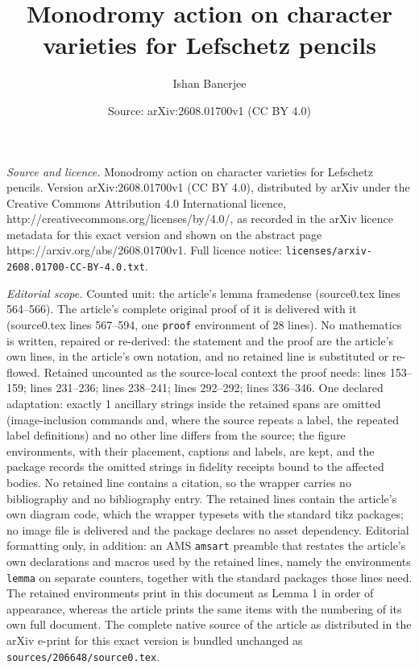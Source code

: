 \documentclass[10pt,a4paper]{amsart}
\title{Monodromy action on character varieties for Lefschetz pencils}
\author{Ishan Banerjee}
\date{Source: arXiv:2608.01700v1 (CC BY 4.0)}
\begin{document}
\maketitle

\noindent\emph{Source and licence.} Monodromy action on character varieties for Lefschetz pencils. Version arXiv:2608.01700v1 (CC BY 4.0), distributed by arXiv under the Creative Commons Attribution 4.0 International licence, http://creativecommons.org/licenses/by/4.0/, as recorded in the arXiv licence metadata for this exact version and shown on the abstract page https://arxiv.org/abs/2608.01700v1. Full licence notice: \texttt{licenses/arxiv-2608.01700-CC-BY-4.0.txt}.\par\smallskip

\noindent\textit{Editorial scope.} Counted unit: the article's lemma framedense (source0.tex lines 564--566). The article's complete original proof of it is delivered with it (source0.tex lines 567--594, one \texttt{proof} environment of 28 lines). No mathematics is written, repaired or re-derived: the statement and the proof are the article's own lines, in the article's own notation, and no retained line is substituted or re-flowed.  Retained uncounted as the source-local context the proof needs: lines 153--159; lines 231--236; lines 238--241; lines 292--292; lines 336--346.  One declared adaptation: exactly 1 ancillary strings inside the retained spans are omitted (image-inclusion commands and, where the source repeats a label, the repeated label definitions) and no other line differs from the source; the figure environments, with their placement, captions and labels, are kept, and the package records the omitted strings in fidelity receipts bound to the affected bodies.  No retained line contains a citation, so the wrapper carries no bibliography and no bibliography entry.  The retained lines contain the article's own diagram code, which the wrapper typesets with the standard tikz packages; no image file is delivered and the package declares no asset dependency.  Editorial formatting only, in addition: an AMS \texttt{amsart} preamble that restates the article's own declarations and macros used by the retained lines, namely the environments \texttt{lemma} on separate counters, together with the standard packages those lines need.  The retained environments print in this document as Lemma 1 in order of appearance, whereas the article prints the same items with the numbering of its own full document.  The complete native source of the article as distributed in the arXiv e-print for this exact version is bundled unchanged as \texttt{sources/206648/source0.tex}.
\end{document}
